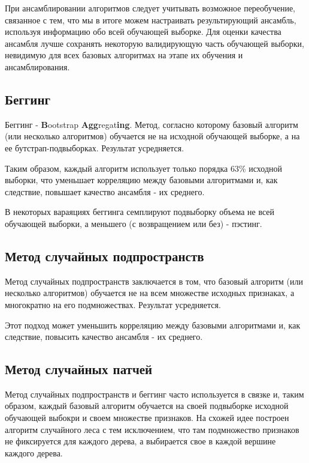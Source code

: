 При ансамблировании алгоритмов следует учитывать возможное переобучение, связанное с тем, что мы в итоге можем настраивать результирующий ансамбль, используя информацию обо всей обучающей выборке. Для оценки качества ансамбля лучше сохранять некоторую валидирующую часть обучающей выборки, невидимую для всех базовых алгоритмах на этапе их обучения и ансамблирования.   

\subsection{Беггинг}

Беггинг - \textbf{B}ootstrap \textbf{Agg}regat\textbf{ing}. Метод, согласно которому базовый алгоритм (или несколько алгоритмов) обучается не на исходной обучающей выборке, а на ее бутстрап-подвыборках. Результат усредняется.

Таким образом, каждый алгоритм использует только порядка 63\% исходной выборки, что уменьшает корреляцию между базовыми алгоритмами и, как следствие, повышает качество ансамбля - их среднего.

В некоторых вараяциях беггинга семплируют подвыборку объема не всей обучающей выборки, а меньшего (с возвращением или без) - пэстинг.  

\subsection{Метод случайных подпространств}

Метод случайных подпространств заключается в том, что базовый алгоритм (или несколько алгоритмов) обучается не на всем множестве исходных признаках, а многократно на его подмножествах. Результат усредняется.

Этот подход может уменьшить корреляцию между базовыми алгоритмами и, как следствие, повысить качество ансамбля - их среднего.

\subsection{Метод случайных патчей}

Метод случайных подпространств и беггинг часто используется в связке и, таким образом, каждый базовый алгоритм обучается на своей подвыборке исходной обучающей выбокри и своем множестве признаков. На схожей идее построен алгоритм случайного леса с тем исключением, что там подмножество признаков не фиксируется для каждого дерева, а выбирается свое в каждой вершине каждого дерева.

